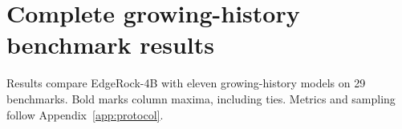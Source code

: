 \FloatBarrier
{}
\section{Complete growing-history benchmark results}
\label{app:growing-results}
Results compare EdgeRock-4B with eleven growing-history models on 29 benchmarks. Bold marks column maxima, including ties. Metrics and sampling follow Appendix~\ref{app:protocol}.

\GrowingMathResults
\GrowingKnowledgeResults
\FloatBarrier
\GrowingReasoningResults
\GrowingCodeInstructionResults
\FloatBarrier
\GrowingAdditionalResults
\FloatBarrier
